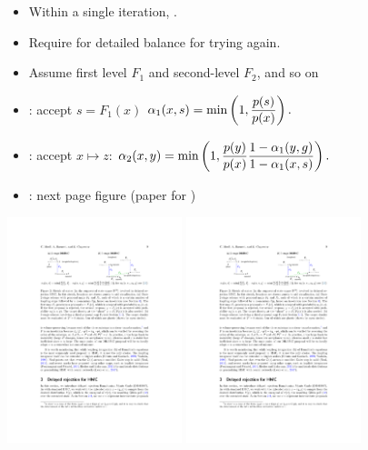 \documentclass[10pt]{report}
\newcommand{\ddfrac}[2]{\frac{\strut \displaystyle #1}{\strut \displaystyle #2}}
\begin{document}
\begin{itemize}
\item Within a single iteration, .
\item Require  for detailed balance for
  trying again.
\item Assume first level  $F_1$ and second-level $F_2$, and so on
\item {}: accept $s = F_1(x)$ $\alpha_1(x, s) =
  \textrm{min}\left(1, \ddfrac{p(s)}{p(x)} \right).$
\item {}: accept $x \mapsto z$: $\alpha_2(x, y) =
  \textrm{min}\left(1, \ddfrac{p(y)}{p(x)} \ddfrac{1 - \alpha_1(y, g)}{1 -
      \alpha_1(x, s)}
  \right).$
  \item {}: next page figure (paper for
    )
\end{itemize}

\begin{center}
\includegraphics[width=2in]{img/dr-1.pdf}
\includegraphics[width=2in]{img/dr-2.pdf}
\end{center}
\end{document}
